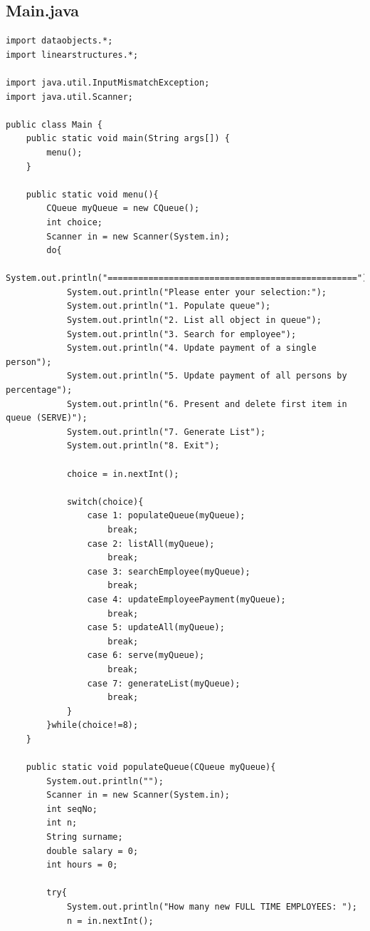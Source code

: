 \documentclass[12pt]{article}
\begin{document}
\subsection{Main.java}
\begin{lstlisting}
import dataobjects.*;
import linearstructures.*;

import java.util.InputMismatchException;
import java.util.Scanner;

public class Main {
    public static void main(String args[]) {        
        menu();
    }

    public static void menu(){
        CQueue myQueue = new CQueue();
        int choice;
        Scanner in = new Scanner(System.in);
        do{
            System.out.println("=================================================");
            System.out.println("Please enter your selection:");
            System.out.println("1. Populate queue");            
            System.out.println("2. List all object in queue");
            System.out.println("3. Search for employee");
            System.out.println("4. Update payment of a single person");
            System.out.println("5. Update payment of all persons by percentage");
            System.out.println("6. Present and delete first item in queue (SERVE)");
            System.out.println("7. Generate List");
            System.out.println("8. Exit");

            choice = in.nextInt();

            switch(choice){
                case 1: populateQueue(myQueue);
                    break;
                case 2: listAll(myQueue);
                    break;   
                case 3: searchEmployee(myQueue);
                    break; 
                case 4: updateEmployeePayment(myQueue);
                    break;
                case 5: updateAll(myQueue);
                    break; 
                case 6: serve(myQueue);
                    break;   
                case 7: generateList(myQueue);
                    break;            
            }
        }while(choice!=8);
    }

    public static void populateQueue(CQueue myQueue){
        System.out.println("");
        Scanner in = new Scanner(System.in);
        int seqNo;
        int n;
        String surname;
        double salary = 0;
        int hours = 0;

        try{
            System.out.println("How many new FULL TIME EMPLOYEES: ");
            n = in.nextInt();
            

\end{lstlisting}
\end{document}
